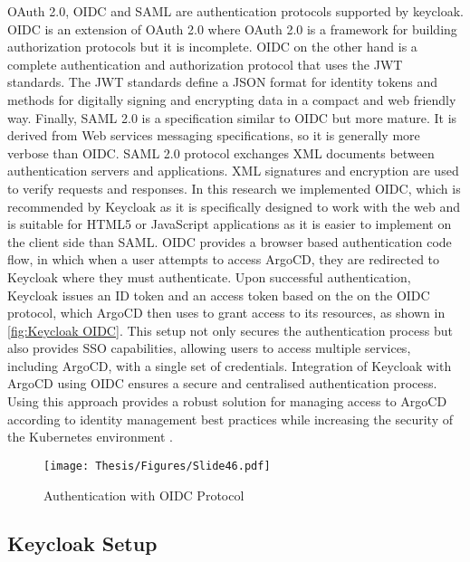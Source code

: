 OAuth 2.0, OIDC and SAML are authentication protocols supported by keycloak. OIDC is an extension of OAuth 2.0 where OAuth 2.0 is a framework for building authorization protocols but it is incomplete. OIDC on the other hand is a complete authentication and authorization protocol that uses the JWT standards. The JWT standards define a JSON format for identity tokens and methods for digitally signing and encrypting data in a compact and web friendly way. Finally, SAML 2.0 is a specification similar to OIDC but more mature. It is derived from Web services messaging specifications, so it is generally more verbose than OIDC. SAML 2.0 protocol exchanges XML documents between authentication servers and applications. XML signatures and encryption are used to verify requests and responses. In this research we implemented OIDC, which is recommended by Keycloak as it is specifically designed to work with the web and is suitable for HTML5 or JavaScript applications as it is easier to implement on the client side than SAML. OIDC provides a browser based authentication code flow, in which when a user attempts to access ArgoCD, they are redirected to Keycloak where they must authenticate. Upon successful authentication, Keycloak issues an ID token and an access token based on the on the OIDC protocol, which ArgoCD then uses to grant access to its resources, as shown in \autoref{fig:Keycloak OIDC}. This setup not only secures the authentication process but also provides SSO capabilities, allowing users to access multiple services, including ArgoCD, with a single set of credentials. Integration of Keycloak with ArgoCD using OIDC ensures
a secure and centralised authentication process. Using this approach provides a robust solution for managing access to ArgoCD according to identity management best practices while increasing the security of the Kubernetes environment \cite{argocd_docs, oauth_oidc_2023}. \cite{keycloak_doc}



\clearpage

\begin{figure}[h]
\centering
\texttt{[image: Thesis/Figures/Slide46.pdf]}
\caption{\label{fig:Keycloak OIDC}Authentication with OIDC Protocol \cite{mohsen_talal_openid_connect}}
\end{figure}


\subsection{Keycloak Setup}

